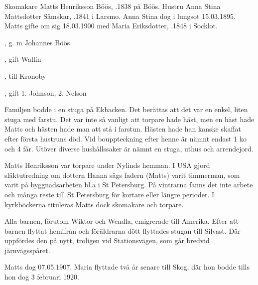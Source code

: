 %
Skomakare Matts Henriksson Böös, .1838 på Böös. Hustru Anna Stina Mattsdotter Sämskar, .1841 i Larsmo. Anna Stina dog i lungsot 15.03.1895. Matts gifte om sig 18.03.1900 med Maria Eriksdotter, .1848 i Socklot.
\begin{jhchildren}
  \item {}
  \item {}, g. m Johannes Böös
  \item {}, gift Wallin
  \item {}
  \item {}, till Kronoby
  \item {}
  \item {}, gift 1. Johnson, 2. Nelson
\end{jhchildren}
Familjen bodde i en stuga på Ekbacken. Det berättas att det var en enkel, liten stuga med farstu. Det var inte så vanligt att torpare hade häst, men en häst hade Matts och hästen hade man att stå i farstun. Hästen hade han kanske skaffat efter första hustruns död. Vid bouppteckning efter henne är nämnt endast 1 ko och 4 får. Utöver diverse hushållssaker är nämnt en stuga, uthus och arrendejord.

Matts Henriksson var torpare under Nylinds hemman. I USA gjord släktutredning om dottern Hanna sägs fadern (Matts) varit timmerman, som varit på byggnadsarbeten bl.a i St Petersburg. På vintrarna fanns det inte arbete och många reste till St Petersburg för kortare eller längre perioder. I kyrkböckerna tituleras Matts dock skomakare och torpare.

Alla barnen, förutom Wiktor och Wendla, emigrerade till Amerika. Efter att barnen flyttat hemifrån och föräldrarna dött flyttades stugan till Silvast. Där uppfördes den på nytt, troligen vid Stationsvägen, som går bredvid järnvägsspåret.

Matts dog 07.05.1907, Maria flyttade två år senare till Skog, där hon bodde tills hon dog 3 februari 1920.


